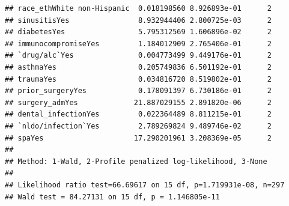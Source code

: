 \documentclass[
]{article}
\newenvironment{Shaded}{\begin{snugshade}}{\end{snugshade}}
\newcommand{\AttributeTok}[1]{\textcolor[rgb]{0.13,0.29,0.53}{#1}}
\newcommand{\CommentTok}[1]{\textcolor[rgb]{0.56,0.35,0.01}{\textit{#1}}}
\newcommand{\DecValTok}[1]{\textcolor[rgb]{0.00,0.00,0.81}{#1}}
\newcommand{\FunctionTok}[1]{\textcolor[rgb]{0.13,0.29,0.53}{\textbf{#1}}}
\newcommand{\NormalTok}[1]{#1}
\newcommand{\OtherTok}[1]{\textcolor[rgb]{0.56,0.35,0.01}{#1}}
\newcommand{\SpecialCharTok}[1]{\textcolor[rgb]{0.81,0.36,0.00}{\textbf{#1}}}
\newcommand{\StringTok}[1]{\textcolor[rgb]{0.31,0.60,0.02}{#1}}
\begin{document}
\begin{verbatim}
## race_ethWhite non-Hispanic  0.018198560 8.926893e-01      2
## sinusitisYes                8.932944406 2.800725e-03      2
## diabetesYes                 5.795312569 1.606896e-02      2
## immunocompromiseYes         1.184012909 2.765406e-01      2
## `drug/alc`Yes               0.004773499 9.449176e-01      2
## asthmaYes                   0.205749836 6.501192e-01      2
## traumaYes                   0.034816720 8.519802e-01      2
## prior_surgeryYes            0.178091397 6.730186e-01      2
## surgery_admYes             21.887029155 2.891820e-06      2
## dental_infectionYes         0.022364489 8.811215e-01      2
## `nldo/infection`Yes         2.789269824 9.489746e-02      2
## spaYes                     17.290201961 3.208369e-05      2
## 
## Method: 1-Wald, 2-Profile penalized log-likelihood, 3-None
## 
## Likelihood ratio test=66.69617 on 15 df, p=1.719931e-08, n=297
## Wald test = 84.27131 on 15 df, p = 1.146805e-11
\end{verbatim}

\begin{Shaded}
\end{Shaded}
\end{document}
